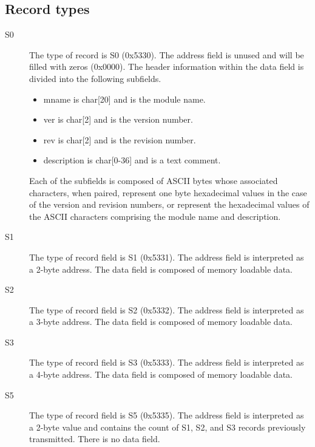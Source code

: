     \subsection{Record types}
        \begin{description}
            \item[S0]
                The type of record is S0 (0x5330). The address field is unused and will be filled with zeros (0x0000). The header information within the data field is divided into the following subfields.

                \begin{itemize}
                    \item mname is char[20] and is the module name.
                    \item ver is char[2] and is the version number.
                    \item rev is char[2] and is the revision number.
                    \item description is char[0-36] and is a text comment.
                \end{itemize}

                Each of the subfields is composed of ASCII bytes whose associated characters, when paired, represent one byte hexadecimal values in the case of the version and revision numbers, or represent the hexadecimal values of the ASCII characters comprising the module name and description.

            \item[S1]
                The type of record field is S1 (0x5331). The address field is interpreted as a 2-byte address. The data field is composed of memory loadable data.

            \item[S2]
                The type of record field is S2 (0x5332). The address field is interpreted as a 3-byte address. The data field is composed of memory loadable data.

            \item[S3]
                The type of record field is S3 (0x5333). The address field is interpreted as a 4-byte address. The data field is composed of memory loadable data.

            \item[S5]
                The type of record field is S5 (0x5335). The address field is interpreted as a 2-byte value and contains the count of S1, S2, and S3 records previously transmitted. There is no data field.


\end{description}
